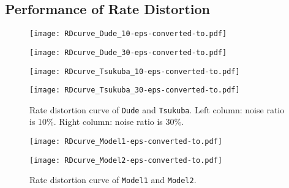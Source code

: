 \subsection{Performance of Rate Distortion}
\label{subsec:RD_performance}

\begin{figure}[t]

\begin{minipage}[b]{.48\linewidth}
  \centering
  \centerline{\texttt{[image: RDcurve\_Dude\_10-eps-converted-to.pdf]}}
\end{minipage}
\hfill
\begin{minipage}[b]{0.48\linewidth}
  \centering
  \centerline{\texttt{[image: RDcurve\_Dude\_30-eps-converted-to.pdf]}}
\end{minipage}
\vfill
\vspace{0.3cm}
\begin{minipage}[b]{.48\linewidth}
  \centering
  \centerline{\texttt{[image: RDcurve\_Tsukuba\_10-eps-converted-to.pdf]}}
\end{minipage}
\hfill
\begin{minipage}[b]{0.48\linewidth}
  \centering
  \centerline{\texttt{[image: RDcurve\_Tsukuba\_30-eps-converted-to.pdf]}}
\end{minipage}

\caption{Rate distortion curve of \texttt{Dude} and \texttt{Tsukuba}. Left column: noise ratio is 10\%. Right column: noise ratio is 30\%.}
\label{fig:RDcurve_synthetic}
\end{figure}

\begin{figure}[t]

\begin{minipage}[b]{.48\linewidth}
  \centering
  \centerline{\texttt{[image: RDcurve\_Model1-eps-converted-to.pdf]}}
\end{minipage}
\hfill
\begin{minipage}[b]{0.48\linewidth}
  \centering
  \centerline{\texttt{[image: RDcurve\_Model2-eps-converted-to.pdf]}}
\end{minipage}

\vspace{-0.2cm}
\caption{Rate distortion curve of \texttt{Model1} and \texttt{Model2}.}
\label{fig:RDcurve_silhouette}
\end{figure}


